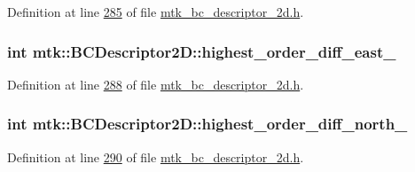 Definition at line \hyperlink{mtk__bc__descriptor__2d_8h_source_l00285}{285} of file \hyperlink{mtk__bc__descriptor__2d_8h_source}{mtk\+\_\+bc\+\_\+descriptor\+\_\+2d.\+h}.

\hypertarget{classmtk_1_1BCDescriptor2D_aea5e539a10d5641bd605ebe583c14bc5}{
\subsubsection[{highest\+\_\+order\+\_\+diff\+\_\+east\+\_\+}]{\setlength{\rightskip}{0pt plus 5cm}int mtk\+::\+B\+C\+Descriptor2\+D\+::highest\+\_\+order\+\_\+diff\+\_\+east\+\_\+\hspace{0.3cm}{\ttfamily [private]}}}\label{classmtk_1_1BCDescriptor2D_aea5e539a10d5641bd605ebe583c14bc5}


Definition at line \hyperlink{mtk__bc__descriptor__2d_8h_source_l00288}{288} of file \hyperlink{mtk__bc__descriptor__2d_8h_source}{mtk\+\_\+bc\+\_\+descriptor\+\_\+2d.\+h}.

\hypertarget{classmtk_1_1BCDescriptor2D_a6cdeefe70f5bef93196f34ab2949cad2}{
\subsubsection[{highest\+\_\+order\+\_\+diff\+\_\+north\+\_\+}]{\setlength{\rightskip}{0pt plus 5cm}int mtk\+::\+B\+C\+Descriptor2\+D\+::highest\+\_\+order\+\_\+diff\+\_\+north\+\_\+\hspace{0.3cm}{\ttfamily [private]}}}\label{classmtk_1_1BCDescriptor2D_a6cdeefe70f5bef93196f34ab2949cad2}


Definition at line \hyperlink{mtk__bc__descriptor__2d_8h_source_l00290}{290} of file \hyperlink{mtk__bc__descriptor__2d_8h_source}{mtk\+\_\+bc\+\_\+descriptor\+\_\+2d.\+h}.

